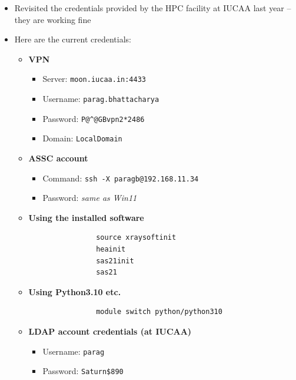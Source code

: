 	\begin{itemize}
		\item Revisited the credentials provided by the HPC facility at IUCAA last year -- they are working fine
		
		\item Here are the current credentials:
		\begin{itemize}
			\item \textbf{VPN}
			\begin{itemize}
				\item Server: \verb|moon.iucaa.in:4433|
				\item Username: \verb|parag.bhattacharya|
				\item Password: \verb|P@^@GBvpn2*2486|
				\item Domain: \verb|LocalDomain|
			\end{itemize}
			
			\item \textbf{ASSC account}
			\begin{itemize}
				\item Command: \verb|ssh -X paragb@192.168.11.34|
				\item Password: \textit{same as Win11}
			\end{itemize}
			
			\item \textbf{Using the installed software}
			\begin{verbatim}
				source xraysoftinit
				heainit
				sas21init
				sas21
			\end{verbatim}
			
			\item \textbf{Using Python3.10 etc.}
			\begin{verbatim}
				module switch python/python310
			\end{verbatim}
			
			\item \textbf{LDAP account credentials (at IUCAA)}
			\begin{itemize}
				\item Username: \verb|parag|
				\item Password: \verb|Saturn$890|
			\end{itemize}
		\end{itemize}
	\end{itemize}